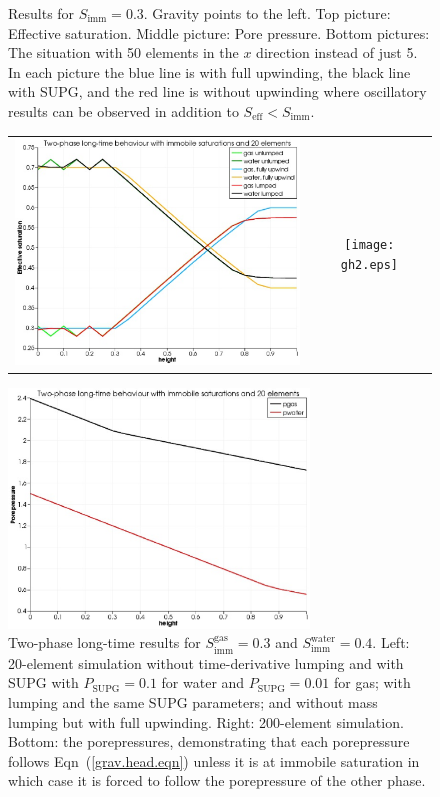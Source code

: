 \documentclass[]{scrreprt}
\begin{document}
\begin{figure}[htb]
\begin{tabular}{cc}
\end{tabular}
\caption{Results for $S_{\mathrm{imm}}=0.3$.  Gravity points to the
  left.  Top picture: Effective saturation.  Middle picture: Pore
  pressure.  Bottom pictures: The situation with 50 elements in the
  $x$ direction instead of just 5.  In each picture the blue line is
  with full upwinding, the black line with SUPG, and the red line is
  without upwinding where oscillatory results can be observed in addition to
  $S_{\mathrm{eff}}< S_{\mathrm{imm}}$.}
\label{gh.fig}
\end{figure}

\begin{figure}[htb]
\centering
\begin{tabular}{cc}
\includegraphics[width=8cm]{gh2_20.eps} &
\texttt{[image: gh2.eps]}
\end{tabular}
\includegraphics[width=8cm]{gh2_p.eps} 
\caption{Two-phase long-time results for
  $S^{\mathrm{gas}}_{\mathrm{imm}}=0.3$ and
  $S^{\mathrm{water}}_{\mathrm{imm}}=0.4$.  Left: 20-element
  simulation without time-derivative lumping and with SUPG with
  $P_{\mathrm{SUPG}}=0.1$ for water and $P_{\mathrm{SUPG}}=0.01$ for
  gas; with lumping and the same SUPG parameters; and without mass
  lumping but with full upwinding.  Right: 200-element simulation.
  Bottom: the porepressures, demonstrating that each porepressure
  follows Eqn~(\ref{grav.head.eqn}) unless it is at immobile
  saturation in which case it is forced to follow the porepressure of
  the other phase.}
\label{gh2.fig}
\end{figure}
\end{document}
